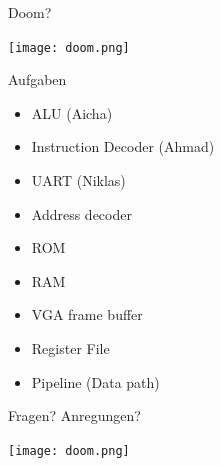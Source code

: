 \begin{frame}{Doom?}
\begin{center}
\texttt{[image: doom.png]}
\end{center}
 

\end{frame}

\begin{frame}{Aufgaben}
\begin{itemize}
\item ALU (Aicha)
\item Instruction Decoder (Ahmad)
\item UART (Niklas)
\item Address decoder
\item ROM
\item RAM
\item VGA frame buffer
\item Register File
\item Pipeline (Data path)
\end{itemize}	
\end{frame}

\begin{frame}{Fragen? Anregungen?} %
\begin{center}
\texttt{[image: doom.png]}
\end{center}
 


\end{frame}


